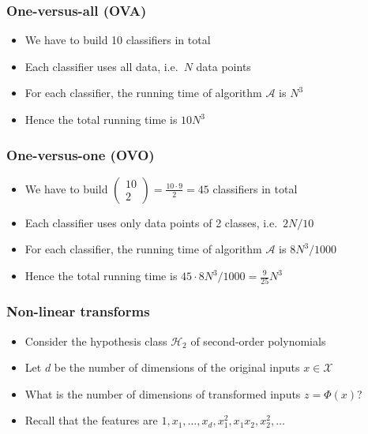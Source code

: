 \documentclass[10pt]{beamer}
\begin{document}
\begin{frame}
  \frametitle{One-versus-all (OVA)}
  \begin{itemize}
  \item We have to build 10 classifiers in total
  \pause
  \item Each classifier uses {\color{red} all data}, i.e.~$N$ data points
  \pause
  \item For each classifier, the running time of algorithm $\mathcal{A}$ is $N^3$
  \pause
  \item Hence the total running time is $10N^3$
  \end{itemize}
\end{frame}

\begin{frame}
  \frametitle{One-versus-one (OVO)}
  \begin{itemize}
  \item We have to build $\left( \begin{array}{c} 10\\ 2 \end{array} \right)=\frac {10\cdot 9} 2 = 45$ classifiers in total
  \pause
  \item Each classifier uses only data points of 2 classes, i.e.~$2N/10$
  \pause
  \item For each classifier, the running time of algorithm $\mathcal{A}$ is $8N^3/1000$
  \pause
  \item Hence the total running time is $45\cdot 8N^3/1000 = \frac 9 {25} N^3$
  \end{itemize}
\end{frame}

\begin{frame}
  \frametitle{Non-linear transforms}
  \begin{itemize}
  \item Consider the hypothesis class $\mathcal{H}_2$ of second-order polynomials
  \item Let $d$ be the number of dimensions of the original inputs $x\in\mathcal{X}$
  \item What is the number of dimensions of transformed inputs $z=\Phi(x)$?
  \item Recall that the features are $1,x_1,\ldots,x_d,x_1^2,x_1x_2,x_2^2,\ldots$
  \end{itemize}
\end{frame}
\end{document}
